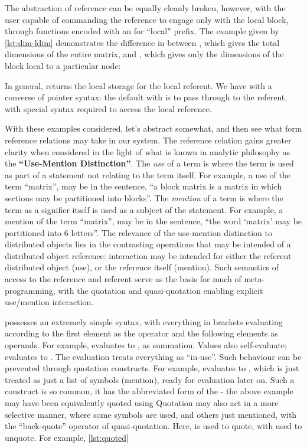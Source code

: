 The abstraction of reference can be equally cleanly broken, however,
with the user capable of commanding the reference to engage only with
the local block, through functions encoded with an  for
``local'' prefix. The example given by \cref{lst:dim-ldim} demonstrates the difference in
 between , which gives the total dimensions of the
entire matrix, and , which gives only the dimensions of the
block local to a particular node:


In general,  returns the local storage for the
 local referent. We have with  a converse of
pointer syntax: the default with  is to pass through to the
referent, with special syntax required to access the local reference.

With these examples considered, let's abstract somewhat, and then see
what form reference relations may take in our system. The reference
relation gains greater clarity when considered in the light of what is
known in analytic philosophy as the \textbf{``Use-Mention
    Distinction''}. The \emph{use} of a term is where the term is used as
part of a statement not relating to the term itself. For example, a use
of the term ``matrix'', may be in the sentence, ``a block matrix is a
matrix in which sections may be partitioned into blocks''. The
\emph{mention} of a term is where the term as a signifier itself is used
as a subject of the statement. For example, a mention of the term
``matrix'', may be in the sentence, ``the word `matrix' may be
partitioned into 6 letters''. The relevance of the use-mention
distinction to distributed objects lies in the contrasting operations
that may be intended of a distributed object reference: interaction may
be intended for either the referent distributed object (use), or the
reference itself (mention). Such semantics of access to the reference
and referent serve as the basis for much of meta-programming, with the
 quotation and quasi-quotation enabling explicit use/mention
interaction.

 possesses an extremely simple syntax, with everything in brackets
evaluating according to the first element as the operator and the
following elements as operands. For example, 
evaluates to , as summation. Values also self-evaluate;
 evaluates to . The evaluation treats everything as
``in-use''. Such behaviour can be prevented through quotation
constructs. For example,  evaluates to
, which is just treated as just a list of symbols
(mention), ready for evaluation later on. Such a construct is so common,
it has the abbreviated form of the  - the
above example may have been equivalently quoted using
 Quotation may also act in a
more selective manner, where some symbols are used, and others just
mentioned, with the ``back-quote'' operator of quasi-quotation. Here,
 is used to quote, with  used to
unquote. For example, \cref{lst:quoted}

